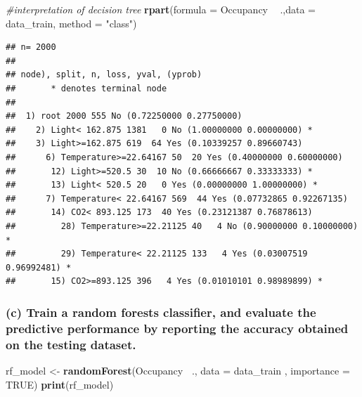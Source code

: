 \documentclass[]{article}
\newenvironment{Shaded}{\begin{snugshade}}{\end{snugshade}}
\newcommand{\CommentTok}[1]{\textcolor[rgb]{0.56,0.35,0.01}{\textit{#1}}}
\newcommand{\DataTypeTok}[1]{\textcolor[rgb]{0.13,0.29,0.53}{#1}}
\newcommand{\KeywordTok}[1]{\textcolor[rgb]{0.13,0.29,0.53}{\textbf{#1}}}
\newcommand{\NormalTok}[1]{#1}
\newcommand{\OperatorTok}[1]{\textcolor[rgb]{0.81,0.36,0.00}{\textbf{#1}}}
\newcommand{\OtherTok}[1]{\textcolor[rgb]{0.56,0.35,0.01}{#1}}
\newcommand{\StringTok}[1]{\textcolor[rgb]{0.31,0.60,0.02}{#1}}
\begin{document}
\begin{Shaded}
\begin{Highlighting}[]
\CommentTok{#interpretation of decision tree}
\KeywordTok{rpart}\NormalTok{(}\DataTypeTok{formula =}\NormalTok{ Occupancy }\OperatorTok{~}\StringTok{ }\NormalTok{.,}\DataTypeTok{data =}\NormalTok{ data_train, }\DataTypeTok{method =} \StringTok{"class"}\NormalTok{)}
\end{Highlighting}
\end{Shaded}

\begin{verbatim}
## n= 2000 
## 
## node), split, n, loss, yval, (yprob)
##       * denotes terminal node
## 
##  1) root 2000 555 No (0.72250000 0.27750000)  
##    2) Light< 162.875 1381   0 No (1.00000000 0.00000000) *
##    3) Light>=162.875 619  64 Yes (0.10339257 0.89660743)  
##      6) Temperature>=22.64167 50  20 Yes (0.40000000 0.60000000)  
##       12) Light>=520.5 30  10 No (0.66666667 0.33333333) *
##       13) Light< 520.5 20   0 Yes (0.00000000 1.00000000) *
##      7) Temperature< 22.64167 569  44 Yes (0.07732865 0.92267135)  
##       14) CO2< 893.125 173  40 Yes (0.23121387 0.76878613)  
##         28) Temperature>=22.21125 40   4 No (0.90000000 0.10000000) *
##         29) Temperature< 22.21125 133   4 Yes (0.03007519 0.96992481) *
##       15) CO2>=893.125 396   4 Yes (0.01010101 0.98989899) *
\end{verbatim}

\hypertarget{c-train-a-random-forests-classifier-and-evaluate-the-predictive-performance-by-reporting-the-accuracy-obtained-on-the-testing-dataset.}{%
\subsubsection{(c) Train a random forests classifier, and evaluate the
predictive performance by reporting the accuracy obtained on the testing
dataset.}\label{c-train-a-random-forests-classifier-and-evaluate-the-predictive-performance-by-reporting-the-accuracy-obtained-on-the-testing-dataset.}}

\begin{Shaded}
\begin{Highlighting}[]
\NormalTok{rf_model <-}\StringTok{ }\KeywordTok{randomForest}\NormalTok{(Occupancy }\OperatorTok{~}\NormalTok{., }\DataTypeTok{data =}\NormalTok{ data_train , }\DataTypeTok{importance =} \OtherTok{TRUE}\NormalTok{)}
\KeywordTok{print}\NormalTok{(rf_model)}
\end{Highlighting}
\end{Shaded}
\end{document}
